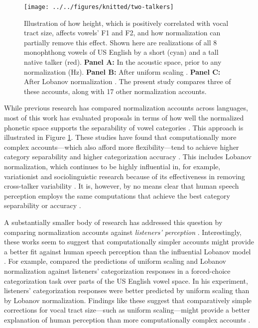 \documentclass[preprint]{JASA}
\begin{document}
\begin{figure}

{\centering \texttt{[image: ../../figures/knitted/two-talkers]} 

}

\caption{Illustration of how height, which is positively correlated with vocal tract size, affects vowels' F1 and F2, and how normalization can partially remove this effect. Shown here are realizations of all 8 monophthong vowels of US English by a short (cyan) and a tall native talker (red). \textbf{Panel A:} In the acoustic space, prior to any normalization (Hz). \textbf{Panel B:} After uniform scaling \citep{nearey1978}. \textbf{Panel C:} After Lobanov normalization \citep{lobanov1971}. The present study compares three of these accounts, along with 17 other normalization accounts.}\label{fig:two-talkers}
\end{figure}

While previous research has compared normalization accounts across languages, most of this work has evaluated proposals in terms of how well the normalized phonetic space supports the separability of vowel categories \citep{adank2004, carpenter-govindarajan1993, cole2010, escudero-bion2007, johnson-sjerps2021, syrdal1985}. This approach is illustrated in Figure \ref{fig:two-talkers}. These studies have found that computationally more complex accounts---which also afford more flexibility---tend to achieve higher category separability and higher categorization accuracy \citep[for review, see][]{persson-jaeger2023}. This includes Lobanov normalization, which continues to be highly influential in, for example, variationist and sociolinguistic research because of its effectiveness in removing cross-talker variability \citep[for a critique, see][]{barreda2021}. It is, however, by no means clear that human speech perception employs the same computations that achieve the best category separability or accuracy \citep[see also discussion in][]{barreda2021, nearey-assmann2007}.

A substantially smaller body of research has addressed this question by comparing normalization accounts against \emph{listeners' perception} \citetext{\citealp{barreda-nearey2012}; \citealp{barreda2021}; \citealp{nearey1989}; \citealp{richter2017}; \citealp[for a review, see][]{whalen2016}}. Interestingly, these works seem to suggest that computationally simpler accounts might provide a better fit against human speech perception than the influential Lobanov model \citep{barreda2021, richter2017}. For example, \citet{barreda2021} compared the predictions of uniform scaling and Lobanov normalization against listeners' categorization responses in a forced-choice categorization task over parts of the US English vowel space. In his experiment, listeners' categorization responses were better predicted by uniform scaling than by Lobanov normalization. Findings like these suggest that comparatively simple corrections for vocal tract size---such as uniform scaling---might provide a better explanation of human perception than more computationally complex accounts \citep[see also][]{johnson2020, richter2017}.
\end{document}
